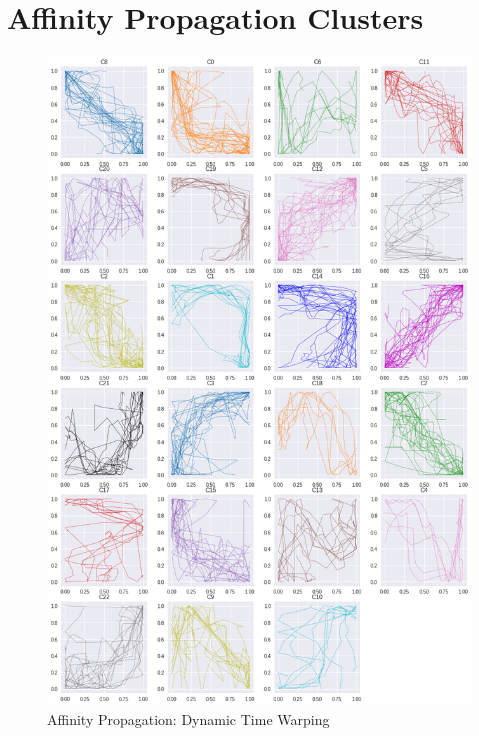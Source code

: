 \chapter{Affinity Propagation Clusters}
\label{app:ap-clu}

\begin{figure}[h]
  \centering
  \includegraphics[width=\linewidth,height=\textheight,keepaspectratio]{figs/clusters/CLU_AP_ALL[DTW].png}
  \caption{Affinity Propagation: Dynamic Time Warping}
\end{figure}

